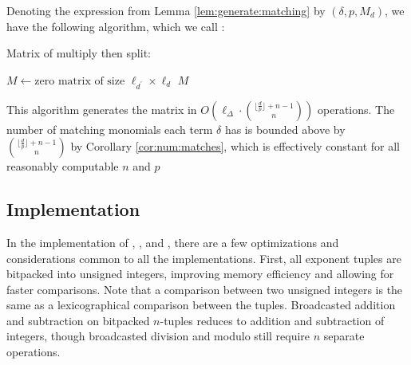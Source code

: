 Denoting the expression from Lemma \ref{lem:generate:matching} 
by $(\delta, p, M_d)$, we have
the following algorithm, which we call \wicsalg:

\begin{algorithm}[H]
    \caption{Matrix of multiply then split: \wicsalg}
    $M \gets \text{zero matrix of size } \ell_{d^\prime} \times \ell_d $\;
    \Return $M$
    \label{alg:matrix:WICS}
\end{algorithm}

This algorithm 
generates the matrix in 
$O \left( \ell_{\Delta} \cdot \binom{\lfloor \frac{d}{p} \rfloor + n - 1}{n} \right)$ operations.
The number of matching monomials each term $\delta$ 
has is bounded above by $\binom{\lfloor \frac{d}{p} \rfloor + n - 1}{n}$ 
by Corollary \ref{cor:num:matches}, which is 
effectively constant for all reasonably computable $n$ and $p$

\subsection{Implementation}

In the implementation of \triv, \merge, and \wicsalg, there are a 
few optimizations and considerations common to all the implementations.
First, all exponent tuples are bitpacked into 
unsigned integers, improving memory efficiency 
and allowing for faster comparisons.
Note that a comparison between two unsigned integers 
is the same as a lexicographical comparison between the tuples.
Broadcasted addition and subtraction on bitpacked 
$n$-tuples reduces to addition and subtraction of 
integers, though broadcasted division and modulo still 
require $n$ separate operations.

